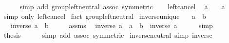 \begin{isabellebody}
\ \ \ \ \isamarkupfalse%
\ {\isacharparenleft}{\kern0pt}simp\ add{\isacharcolon}{\kern0pt}\ group{\isacharunderscore}{\kern0pt}left{\isacharunderscore}{\kern0pt}neutral\ assoc\ {\isacharbrackleft}{\kern0pt}symmetric{\isacharbrackright}{\kern0pt}{\isacharparenright}{\kern0pt}\isanewline
\ \ \isamarkupfalse%
\ left{\isacharunderscore}{\kern0pt}cancel\ \isamarkupfalse%
\ {\isachardoublequoteopen}a\ \isactrlbold {\isacharasterisk}{\kern0pt}\ \ {\isacharequal}{\kern0pt}\ a{\isachardoublequoteclose}\isanewline
\ \ \ \ \isamarkupfalse%
\ {\isacharparenleft}{\kern0pt}simp\ only{\isacharcolon}{\kern0pt}\ left{\isacharunderscore}{\kern0pt}cancel{\isacharparenright}{\kern0pt}\isanewline
{}\isamarkupfalse%
\ {\isacharparenleft}{\kern0pt}fact\ group{\isacharunderscore}{\kern0pt}left{\isacharunderscore}{\kern0pt}neutral{\isacharparenright}{\kern0pt}%
\endisatagproof
{\isafoldproof}%
%
\isadelimproof
\isanewline
%
\endisadelimproof
\isanewline
{}\isamarkupfalse%
\ inverse{\isacharunderscore}{\kern0pt}unique{\isacharcolon}{\kern0pt}\isanewline
\ \ \ {\isachardoublequoteopen}a\ \isactrlbold {\isacharasterisk}{\kern0pt}\ b\ {\isacharequal}{\kern0pt}\ \isanewline
\ \ \ {\isachardoublequoteopen}inverse\ a\ {\isacharequal}{\kern0pt}\ b{\isachardoublequoteclose}\isanewline
%
\isadelimproof
%
\endisadelimproof
%
\isatagproof
{}\isamarkupfalse%
\ {\isacharminus}{\kern0pt}\isanewline
\ \ \isamarkupfalse%
\ assms\ \isamarkupfalse%
\ {\isachardoublequoteopen}inverse\ a\ \isactrlbold {\isacharasterisk}{\kern0pt}\ {\isacharparenleft}{\kern0pt}a\ \isactrlbold {\isacharasterisk}{\kern0pt}\ b{\isacharparenright}{\kern0pt}\ {\isacharequal}{\kern0pt}\ inverse\ a{\isachardoublequoteclose}\isanewline
\ \ \ \ \isamarkupfalse%
\ simp\isanewline
\ \ \isamarkupfalse%
\ \isamarkupfalse%
\ {\isacharquery}{\kern0pt}thesis\isanewline
\ \ \ \ \isamarkupfalse%
\ {\isacharparenleft}{\kern0pt}simp\ add{\isacharcolon}{\kern0pt}\ assoc\ {\isacharbrackleft}{\kern0pt}symmetric{\isacharbrackright}{\kern0pt}{\isacharparenright}{\kern0pt}\isanewline
{}\isamarkupfalse%
%
\endisatagproof
{\isafoldproof}%
%
\isadelimproof
\isanewline
%
\endisadelimproof
\isanewline
{}\isamarkupfalse%
\ inverse{\isacharunderscore}{\kern0pt}neutral\ {\isacharbrackleft}{\kern0pt}simp{\isacharbrackright}{\kern0pt}{\isacharcolon}{\kern0pt}\ {\isachardoublequoteopen}inverse\ \ {\isacharequal}{\kern0pt}\ \isanewline

\end{isabellebody}
